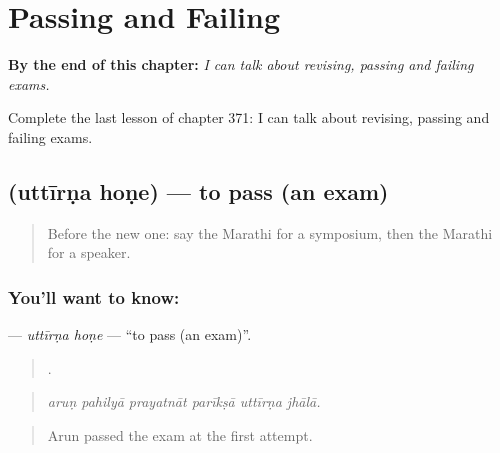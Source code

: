 
\chapter{Passing and Failing}
\label{ch:mr-passing-and-failing}

\begin{chapteropening}
\textbf{By the end of this chapter:} \emph{I can talk about revising, passing and failing exams.}

Complete the last lesson of chapter 371: I can talk about revising, passing and failing exams.
\end{chapteropening}

\section[\texorpdfstring{\mr{उत्तीर्ण} \mr{होणे} (uttīrṇa hoṇe)}{उत्तीर्ण होणे (uttīrṇa hoṇe)}]{  (uttīrṇa hoṇe) — to pass (an exam)}

\label{lesson:MR-C371-uttirna-hone}



\begin{quote}
Before the new one: say the Marathi for a symposium, then the Marathi for a speaker.
\end{quote}

\subsection*{You'll want to know:  }
\textbf{ } — \emph{uttīrṇa hoṇe} — \textquotedblleft{}to pass (an exam)\textquotedblright{}.

\begin{quote}
     .
\end{quote}

\begin{quote}
\emph{aruṇ pahilyā prayatnāt parīkṣā uttīrṇa jhālā.}
\end{quote}

\begin{quote}
Arun passed the exam at the first attempt.
\end{quote}

